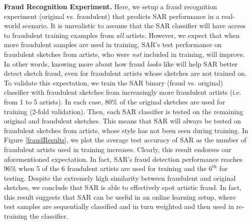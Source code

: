 \noindent\textbf{Fraud Recognition Experiment.} Here, we setup a fraud recognition experiment (original vs. fraudulent) that predicts SAR performance in a real-world scenario. It is unrealistic to assume that the SAR classifier will have access to fraudulent training examples from \emph{all} artists. However, we expect that when more fraudulent samples are used in training, SAR's test performance on fraudulent sketches from artists, who were \emph{not} included in training, will improve. In other words, knowing more about how fraud \emph{looks} like will help SAR better detect sketch fraud, even for fraudulent artists whose sketches are not trained on. To validate this expectation, we train the SAR binary (fraud vs. original) classifier with fraudulent sketches from increasingly more fraudulent artists (i.e. from 1 to 5 artists). In each case, 80\% of the original sketches are used for training (2-fold validation). Then, each SAR classifier is tested on the remaining original and fraudulent sketches. This means that SAR will always be tested on fraudulent sketches from artists, whose style has not been seen during training. In Figure \ref{fraudResults}, we plot the average test accuracy of SAR as the number of fraudulent artists used in training increases. Clearly, this result endorses our aforementioned expectation. In fact, SAR's fraud detection performance reaches 96\% when 5 of the 6 fraudulent artists are used for training and the $6^{\text{th}}$ for testing. Despite the extremely high similarity between fraudulent and original sketches, we conclude that SAR is able to effectively spot artistic fraud. In fact, this result suggests that SAR can be useful in an online learning setup, where test samples are sequentially classified and in turn weighted and then used in re-training the classifier. %




